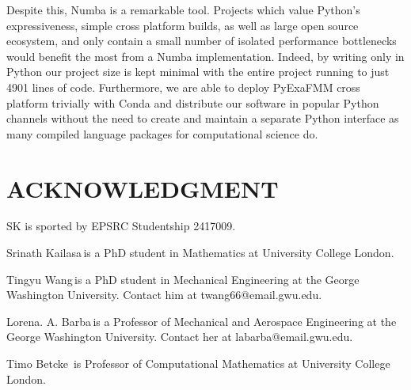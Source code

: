 \documentclass{IEEEcsmag}
\begin{document}
Despite this, Numba is a remarkable tool. Projects which value Python's expressiveness, simple cross platform builds, as well as large open source ecosystem, and only contain a small number of isolated performance bottlenecks would benefit the most from a Numba implementation. Indeed, by writing only in Python our project size is kept minimal with the entire project running to just 4901 lines of code. Furthermore, we are able to deploy PyExaFMM cross platform trivially with Conda and distribute our software in popular Python channels without the need to create and maintain a separate Python interface as many compiled language packages for computational science do. 

\section{ACKNOWLEDGMENT}

SK is sported by EPSRC Studentship 2417009.





\begin{IEEEbiography}{Srinath Kailasa}{\,}is a PhD student in Mathematics at University College London.
\end{IEEEbiography}

\begin{IEEEbiography}{Tingyu Wang}{\,}is a PhD student in Mechanical Engineering at the George Washington University. Contact him at twang66@email.gwu.edu.
\end{IEEEbiography}

\begin{IEEEbiography}{Lorena. A. Barba}{\,}is a Professor of Mechanical and Aerospace Engineering at the George Washington University.  Contact her at labarba@email.gwu.edu.
\end{IEEEbiography}

\begin{IEEEbiography}{Timo Betcke}{\,} is Professor of Computational Mathematics at University College London.
\end{IEEEbiography}
\end{document}
